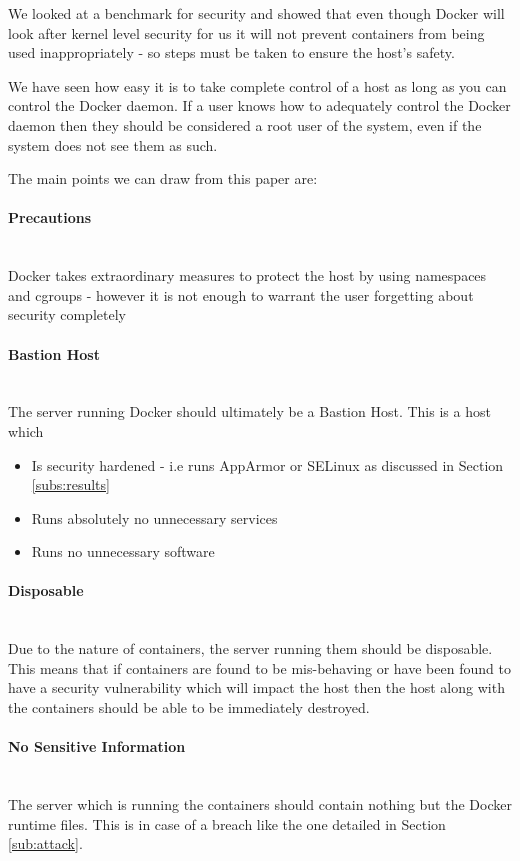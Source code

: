 \documentclass{article}
\begin{document}
We looked at a benchmark for security and showed that even though Docker will look after kernel level security for us it will not prevent containers from being used inappropriately - so steps must be taken to ensure the host's safety.

We have seen how easy it is to take complete control of a host as long as you can control the Docker daemon. If a user knows how to adequately control the Docker daemon then they should be considered a root user of the system, even if the system does not see them as such.

The main points we can draw from this paper are:
\paragraph{Precautions}\mbox{}\\
Docker takes extraordinary measures to protect the host by using namespaces and cgroups - however it is not enough to warrant the user forgetting about security completely

\paragraph{Bastion Host}\mbox{}\\
The server running Docker should ultimately be a Bastion Host. This is a host which 
\begin{itemize}
  \item Is security hardened - i.e runs AppArmor or SELinux as discussed in Section \ref{subs:results}
  \item Runs absolutely no unnecessary services
  \item Runs no unnecessary software
\end{itemize}

\paragraph{Disposable}\mbox{}\\
Due to the nature of containers, the server running them should be disposable. This means that if containers are found to be mis-behaving or have been found to have a security vulnerability which will impact the host then the host along with the containers should be able to be immediately destroyed.

\paragraph{No Sensitive Information}\mbox{}\\
The server which is running the containers should contain nothing but the Docker runtime files. This is in case of a breach like the one detailed in Section \ref{sub:attack}.
\end{document}
